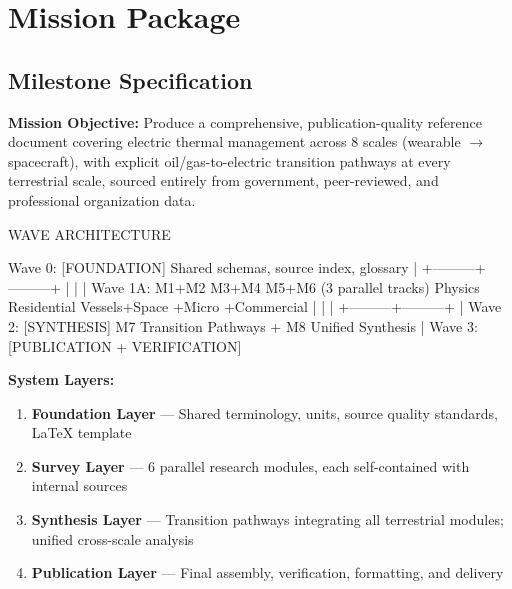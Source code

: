 \documentclass[11pt,letterpaper]{article}
\newcommand{\stageheader}[2]{%
  \noindent\colorbox{#2}{\makebox[\textwidth][l]{%
    \textcolor{white}{\bfseries\sffamily\hspace{6pt}#1\hspace{6pt}}}}%
  \vspace{0.5em}\par%
}
\begin{document}
\newpage

\stageheader{STAGE 3 --- MISSION PACKAGE}{tertiary}

\section{Mission Package}

\subsection{Milestone Specification}

\textbf{Mission Objective:} Produce a comprehensive, publication-quality reference document covering electric thermal management across 8 scales (wearable $\rightarrow$ spacecraft), with explicit oil/gas-to-electric transition pathways at every terrestrial scale, sourced entirely from government, peer-reviewed, and professional organization data.

\begin{asciibox}
WAVE ARCHITECTURE

Wave 0:  [FOUNDATION]  Shared schemas, source index, glossary
              |
         +---------+---------+
         |         |         |
Wave 1A: M1+M2   M3+M4    M5+M6     (3 parallel tracks)
         Physics  Residential  Vessels+Space
         +Micro   +Commercial
         |         |         |
         +---------+---------+
              |
Wave 2:  [SYNTHESIS]  M7 Transition Pathways + M8 Unified Synthesis
              |
Wave 3:  [PUBLICATION + VERIFICATION]
\end{asciibox}

\textbf{System Layers:}
\begin{enumerate}[leftmargin=2em]
\item \textbf{Foundation Layer} --- Shared terminology, units, source quality standards, LaTeX template
\item \textbf{Survey Layer} --- 6 parallel research modules, each self-contained with internal sources
\item \textbf{Synthesis Layer} --- Transition pathways integrating all terrestrial modules; unified cross-scale analysis
\item \textbf{Publication Layer} --- Final assembly, verification, formatting, and delivery
\end{enumerate}
\end{document}
